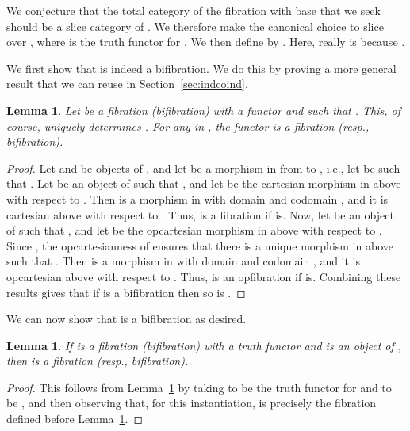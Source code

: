 \documentclass{LMCS}
\theoremstyle{plain}
\newtheorem{lemma}[theorem]{Lemma}
\theoremstyle{remark}
\theoremstyle{definition}
\begin{document}
We conjecture that the total category of the fibration with base
 that we seek should be a slice category of . We therefore
make the canonical choice to slice over , where  is the truth
functor for . We then define  by . Here,  really is
 because .

We first show that  is indeed a bifibration. We do this by
proving a more general result that we can reuse in
Section~\ref{sec:indcoind}. 

\begin{lemma}\label{lem:slbif}
  Let  be a fibration (bifibration) with a functor
   and  such that . This, of course,
  uniquely determines . For any  in , the functor
   is a fibration (resp., bifibration).
\end{lemma}
\begin{proof}
  Let  and  be objects of , and
  let  be a morphism in  from  to ,
  i.e., let  be such that . Let  be an object of  such that , and
  let  be the cartesian morphism in  above
   with respect to . Then  is a morphism in
   with domain  and codomain , and it is
  cartesian above  with respect to . Thus,  is a
  fibration if  is. Now, let  be an object of 
  such that , and let  be the opcartesian morphism in  above  with
  respect to . Since , the opcartesianness of
   ensures that there is a unique morphism  in  above  such that . Then
   is a morphism in  with domain  and codomain
  , and it is opcartesian above  with respect to . Thus,
   is an opfibration if  is. Combining these results gives
  that if  is a bifibration then so is .
\end{proof}

We can now show that  is a bifibration as desired.

\begin{lemma}\label{lem:bif}
  If  is a fibration (bifibration) with a truth functor 
  and  is an object of , then  is a fibration (resp.,
  bifibration).
\end{lemma}
\begin{proof}
This follows from Lemma~\ref{lem:slbif} by taking  to be the truth
functor  for  and  to be , and then observing
that, for this instantiation,  is precisely the fibration 
defined before Lemma~\ref{lem:slbif}.
\end{proof}
\end{document}
